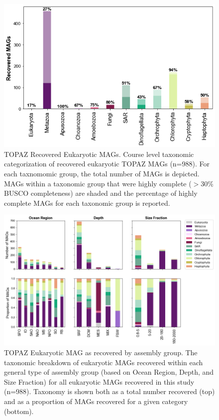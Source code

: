 \documentclass[12pt]{article}
\numberwithin{equation}{section}
\begin{document}
\begin{figure}
    \centering
    \includegraphics[width=0.9\columnwidth]{si-figures/MAGS_recovered.png}
    \caption{TOPAZ Recovered Eukaryotic MAGs. Course level taxonomic categorization of recovered eukaryotic TOPAZ MAGs (n=988). For each taxnomomic group, the total number of MAGs is depicted. MAGs within a taxonomic group that were highly complete ($>30\%$ BUSCO completeness) are shaded and the percentage of highly complete MAGs for each taxonomic group is reported. }
    \label{fig:recovered}
\end{figure}

\begin{landscape}
\begin{figure}
    \centering
    \includegraphics[width=0.95\columnwidth]{si-figures/ALL_MAG_distributions.png}
    \caption{TOPAZ Eukaryotic MAG as recovered by assembly group. The taxonomic breakdown of eukaryotic MAGs recovered within each general type of assembly group (based on Ocean Region, Depth, and Size Fraction) for all eukaryotic MAGs recovered in this study (n=988). Taxonomy is shown both as a total number recovered (top) and as a proportion of MAGs recovered for a given category (bottom). }
    \label{fig:all-dist}
\end{figure}
\end{landscape}
\end{document}
